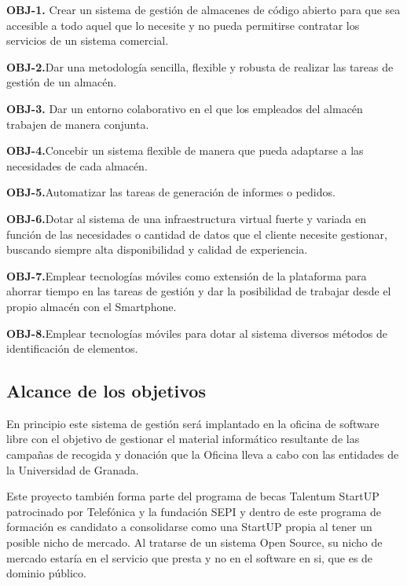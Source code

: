 \documentclass[a4paper,11pt]{book}
\begin{document}
\textbf{OBJ-1.} Crear un sistema de gestión de almacenes de código abierto para que sea accesible  a todo aquel que lo necesite y no pueda permitirse contratar los servicios de un sistema comercial. 

\textbf{OBJ-2.}Dar una metodología sencilla, flexible y robusta de realizar las tareas de gestión de un almacén. 

\textbf{OBJ-3.} Dar un entorno colaborativo en el que los empleados del almacén trabajen de manera conjunta.

\textbf{OBJ-4.}Concebir un sistema flexible de manera que pueda adaptarse a las necesidades de cada almacén.

\textbf{OBJ-5.}Automatizar las tareas de generación de informes o pedidos.

\textbf{OBJ-6.}Dotar al sistema de una infraestructura virtual fuerte y variada en función de las necesidades o cantidad de datos que el cliente necesite gestionar, buscando siempre alta disponibilidad y calidad de experiencia. 

\textbf{OBJ-7.}Emplear tecnologías móviles como extensión de la plataforma para ahorrar tiempo en las tareas de gestión  y dar la posibilidad de trabajar desde el propio almacén con el Smartphone. 

\textbf{OBJ-8.}Emplear tecnologías móviles para dotar al sistema diversos métodos de identificación de elementos. 

\subsection{Alcance de los objetivos}

En principio este sistema de gestión será implantado en la oficina de software libre con el objetivo de gestionar el material informático resultante de las campañas de recogida y donación que la Oficina lleva a cabo con las entidades de la Universidad de Granada. 

Este proyecto también forma parte del programa de becas Talentum StartUP patrocinado por Telefónica y la fundación SEPI y dentro de este programa de formación es candidato a consolidarse como una StartUP propia al tener un posible nicho de mercado. Al tratarse de un sistema Open Source, su nicho de mercado estaría en el servicio que presta y no en el software en si, que es de dominio público. 

 
\end{document}
